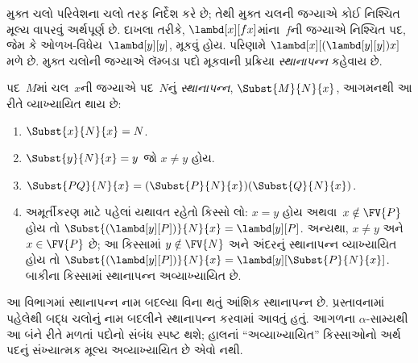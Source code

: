 \documentclass[../../../include/open-logic-section]{subfiles}
\begin{document}

\begin{explain}
મુક્ત ચલો પરિવેશના ચલો તરફ નિર્દેશ કરે છે; તેથી મુક્ત ચલની
જગ્યાએ કોઈ નિશ્ચિત મૂલ્ય વાપરવું અર્થપૂર્ણ છે. દાખલા તરીકે,
$\lambd[x][f x]$માંના~$f$ની જગ્યાએ નિશ્ચિત પદ, જેમ કે
ઓળખ-વિધેય~$\lambd[y][y]$, મૂકવું હોય. પરિણામે
$\lambd[x][(\lambd[y][y]) x]$ મળે છે. મુક્ત ચલોની જગ્યાએ
લૅમ્બડા પદો મૂકવાની પ્રક્રિયા \emph{સ્થાનાપન્ન} કહેવાય છે.
\end{explain}

\begin{defn}[સ્થાનાપન્ન] 
  પદ~$M$માં ચલ~$x$ની જગ્યાએ પદ~$N$નું \emph{સ્થાનાપન્ન},
  $\Subst{M}{N}{x}$, આગમનથી આ રીતે વ્યાખ્યાયિત થાય છે:
  \begin{enumerate}
    \item $\Subst{x}{N}{x} = N$. 
    \item $\Subst{y}{N}{x}  = y$ જો $x \neq y$ હોય.
    \item $\Subst{PQ}{N}{x}  = (\Subst{P}{N}{x}) (\Subst{Q}{N}{x})$.
    \item અમૂર્તીકરણ માટે પહેલાં યથાવત રહેતો કિસ્સો લો:
      $x=y$ હોય અથવા~$x\notin\FV{P}$ હોય તો
      $\Subst{(\lambd[y][P])}{N}{x}=\lambd[y][P]$.
      અન્યથા, $x\neq y$ અને~$x\in\FV{P}$ છે; આ કિસ્સામાં
      $y\notin\FV{N}$ અને અંદરનું સ્થાનાપન્ન વ્યાખ્યાયિત હોય તો
      $\Subst{(\lambd[y][P])}{N}{x}=\lambd[y][\Subst{P}{N}{x}]$.
      બાકીના કિસ્સામાં સ્થાનાપન્ન અવ્યાખ્યાયિત છે.
  \end{enumerate}
\end{defn}
આ વિભાગમાં સ્થાનાપન્ન નામ બદલ્યા વિના થતું આંશિક સ્થાનાપન્ન છે.
પ્રસ્તાવનામાં પહેલેથી બદ્ધ ચલોનું નામ બદલીને સ્થાનાપન્ન કરવામાં
આવતું હતું. આગળના $\alpha$-સામ્યથી આ બંને રીતે મળતાં પદોનો
સંબંધ સ્પષ્ટ થશે; હાલનાં “અવ્યાખ્યાયિત” કિસ્સાઓનો અર્થ
પદનું સંખ્યાત્મક મૂલ્ય અવ્યાખ્યાયિત છે એવો નથી.
\end{document}
